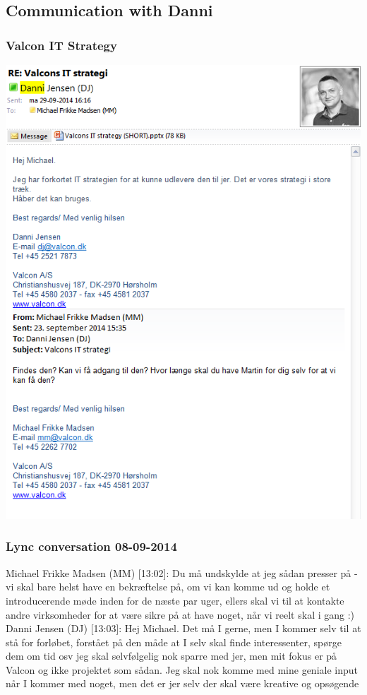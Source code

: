 \subsection{Communication with Danni}

\subsubsection{Valcon IT Strategy}
\includegraphics[width=1.36\textwidth]{appendix/danni_communication_1}

\subsubsection{Lync conversation 08-09-2014}
Michael Frikke Madsen (MM) [13:02]: 
Du må undskylde at jeg sådan presser på - vi skal bare helst have en bekræftelse på, om vi kan komme ud og holde et introducerende møde inden for de næste par uger, ellers skal vi til at kontakte andre virksomheder for at være sikre på at have noget, når vi reelt skal i gang :) \newline
Danni Jensen (DJ) [13:03]: 
Hej Michael. Det må I gerne, men I kommer selv til at stå for forløbet, forstået på den måde at I selv skal finde interessenter, spørge dem om tid osv
jeg skal selvfølgelig nok sparre med jer, men mit fokus er på Valcon og ikke projektet som sådan. Jeg skal nok komme med mine geniale input når I kommer med noget, men det er jer selv der skal være kreative og opsøgende

